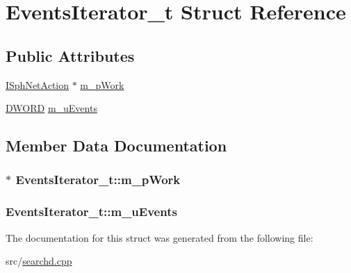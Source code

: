 \hypertarget{structEventsIterator__t}{\section{Events\-Iterator\-\_\-t Struct Reference}
\label{structEventsIterator__t}
}
\subsection*{Public Attributes}
\begin{DoxyCompactItemize}
\item 
\hyperlink{structISphNetAction}{I\-Sph\-Net\-Action} $\ast$ \hyperlink{structEventsIterator__t_a6b29d96bb5a830fb0d8f9f65cde64cd4}{m\-\_\-p\-Work}
\item 
\hyperlink{sphinxstd_8h_a798af1e30bc65f319c1a246cecf59e39}{D\-W\-O\-R\-D} \hyperlink{structEventsIterator__t_a4dc628d92500d7a8630f86b81a67de82}{m\-\_\-u\-Events}
\end{DoxyCompactItemize}


\subsection{Member Data Documentation}
\hypertarget{structEventsIterator__t_a6b29d96bb5a830fb0d8f9f65cde64cd4}{
\subsubsection[{m\-\_\-p\-Work}]{$\ast$ Events\-Iterator\-\_\-t\-::m\-\_\-p\-Work}}\label{structEventsIterator__t_a6b29d96bb5a830fb0d8f9f65cde64cd4}
\hypertarget{structEventsIterator__t_a4dc628d92500d7a8630f86b81a67de82}{
\subsubsection[{m\-\_\-u\-Events}]{ Events\-Iterator\-\_\-t\-::m\-\_\-u\-Events}}\label{structEventsIterator__t_a4dc628d92500d7a8630f86b81a67de82}


The documentation for this struct was generated from the following file\-:\begin{DoxyCompactItemize}
\item 
src/\hyperlink{searchd_8cpp}{searchd.\-cpp}\end{DoxyCompactItemize}
